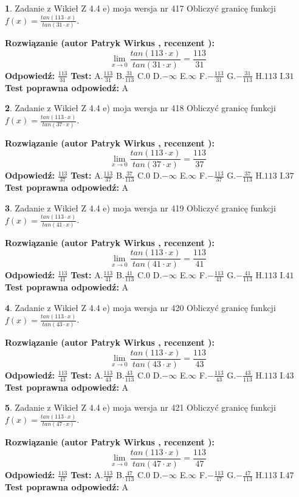 \documentclass[12pt, a4paper]{article}
\theoremstyle{definition} %
\newtheorem{zad}{}
\newcommand{\zadStart}[1]{\begin{zad}#1\newline}
\newcommand{\zadStop}{\end{zad}}
\newcommand{\rozwStart}[2]{\noindent \textbf{Rozwiązanie (autor #1 , recenzent #2): }\newline}
\newcommand{\rozwStop}{\newline}
\newcommand{\odpStart}{\noindent \textbf{Odpowiedź:}\newline}
\newcommand{\odpStop}{\newline}
\newcommand{\testStart}{\noindent \textbf{Test:}\newline}
\newcommand{\testStop}{\newline}
\newcommand{\kluczStart}{\noindent \textbf{Test poprawna odpowiedź:}\newline}
\newcommand{\kluczStop}{\newline}
\begin{document}
\zadStart{Zadanie z Wikieł Z 4.4 e) moja wersja nr 417}
Obliczyć granicę funkcji $f(x)=\frac{tan(113\cdot x)}{tan(31\cdot x)}$.
\zadStop
\rozwStart{Patryk Wirkus}{}
$$\lim\limits_{x\to 0}\frac{tan(113\cdot x)}{tan(31\cdot x)}=
\frac{113}{31}$$
\rozwStop
\odpStart
$\frac{113}{31}$
\odpStop
\testStart
A.$\frac{113}{31}$
B.$\frac{31}{113}$
C.$0$
D.$-\infty$
E.$\infty$
F.$-\frac{113}{31}$
G.$-\frac{31}{113}$
H.$113$
I.$31$
\testStop
\kluczStart
A
\kluczStop



\zadStart{Zadanie z Wikieł Z 4.4 e) moja wersja nr 418}
Obliczyć granicę funkcji $f(x)=\frac{tan(113\cdot x)}{tan(37\cdot x)}$.
\zadStop
\rozwStart{Patryk Wirkus}{}
$$\lim\limits_{x\to 0}\frac{tan(113\cdot x)}{tan(37\cdot x)}=
\frac{113}{37}$$
\rozwStop
\odpStart
$\frac{113}{37}$
\odpStop
\testStart
A.$\frac{113}{37}$
B.$\frac{37}{113}$
C.$0$
D.$-\infty$
E.$\infty$
F.$-\frac{113}{37}$
G.$-\frac{37}{113}$
H.$113$
I.$37$
\testStop
\kluczStart
A
\kluczStop



\zadStart{Zadanie z Wikieł Z 4.4 e) moja wersja nr 419}
Obliczyć granicę funkcji $f(x)=\frac{tan(113\cdot x)}{tan(41\cdot x)}$.
\zadStop
\rozwStart{Patryk Wirkus}{}
$$\lim\limits_{x\to 0}\frac{tan(113\cdot x)}{tan(41\cdot x)}=
\frac{113}{41}$$
\rozwStop
\odpStart
$\frac{113}{41}$
\odpStop
\testStart
A.$\frac{113}{41}$
B.$\frac{41}{113}$
C.$0$
D.$-\infty$
E.$\infty$
F.$-\frac{113}{41}$
G.$-\frac{41}{113}$
H.$113$
I.$41$
\testStop
\kluczStart
A
\kluczStop



\zadStart{Zadanie z Wikieł Z 4.4 e) moja wersja nr 420}
Obliczyć granicę funkcji $f(x)=\frac{tan(113\cdot x)}{tan(43\cdot x)}$.
\zadStop
\rozwStart{Patryk Wirkus}{}
$$\lim\limits_{x\to 0}\frac{tan(113\cdot x)}{tan(43\cdot x)}=
\frac{113}{43}$$
\rozwStop
\odpStart
$\frac{113}{43}$
\odpStop
\testStart
A.$\frac{113}{43}$
B.$\frac{43}{113}$
C.$0$
D.$-\infty$
E.$\infty$
F.$-\frac{113}{43}$
G.$-\frac{43}{113}$
H.$113$
I.$43$
\testStop
\kluczStart
A
\kluczStop



\zadStart{Zadanie z Wikieł Z 4.4 e) moja wersja nr 421}
Obliczyć granicę funkcji $f(x)=\frac{tan(113\cdot x)}{tan(47\cdot x)}$.
\zadStop
\rozwStart{Patryk Wirkus}{}
$$\lim\limits_{x\to 0}\frac{tan(113\cdot x)}{tan(47\cdot x)}=
\frac{113}{47}$$
\rozwStop
\odpStart
$\frac{113}{47}$
\odpStop
\testStart
A.$\frac{113}{47}$
B.$\frac{47}{113}$
C.$0$
D.$-\infty$
E.$\infty$
F.$-\frac{113}{47}$
G.$-\frac{47}{113}$
H.$113$
I.$47$
\testStop
\kluczStart
A
\kluczStop
\end{document}
